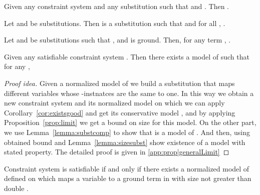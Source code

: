 \begin{lemma}\label{lemma:sizesubst}
Given any constraint system  and any substitution  such that  and .	Then .
\end{lemma}



\begin{df}
	Let  and  be substitutions. Then  is a substitution such that  and for all , .
\end{df}


\begin{lemma}\label{lemma:substcomp}
	Let  and  be substitutions such that ,  and  is ground. Then, for any term , .
\end{lemma}



\begin{prop} \label{prop:generalLimit}
  Given any satisfiable constraint system . Then there exists a model  of  such that for any ,  \begin{proof}[Proof idea]
Given a normalized model  of  we build a substitution  that maps different variables whose -instnatces are the same to one.
In this way we obtain a new constraint system and its normalized model on which we can apply Corollary~\ref{cor:existsgood} and get its conservative model ,
and by applying Proposition~\ref{prop:limit} we get a bound on size for this model. 
On the other part, we use Lemma~\ref{lemma:substcomp} to show that  is a model of .
And then, using obtained bound and Lemma~\ref{lemma:sizesubst} show existence of a model with stated property.
The detailed proof is given in \ref{app:prop|generalLimit}

\end{proof}

\end{prop}


\begin{cor}\label{cor:polynom}
Constraint system   is satisfiable if and only if there exists  a normalized model of  defined on  
which maps a variable to a ground term in   with size not greater than double .


\end{cor}

